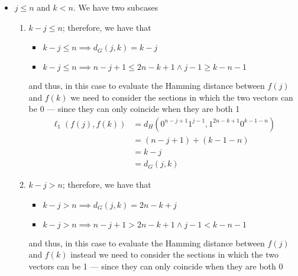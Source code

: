 \documentclass[a4paper, 12pt]{report}
\begin{document}
{\begin{itemize}
            \item $j \le n$ and $k < n$. We have two subcases
                \begin{enumerate}
                    \item $k - j \le n$; therefore, we have that
                        \begin{itemize}
                            \item $k - j \le n \implies d_G(j, k) = k - j$
                            \item $k - j \le n \implies n - j + 1 \le 2n - k + 1 \land j - 1 \ge k - n - 1$
                        \end{itemize}
                        and thus, in this case to evaluate the Hamming distance between $f(j)$ and $f(k)$ we need to consider the sections in which the two vectors can be 0 --- since they can only coincide when they are both 1
                        \begin{equation*}
                            \begin{split}
                                \ell_1(f(j), f(k)) &= d_H(0^{n - j + 1}1^{j - 1}, 1^{2n - k + 1}0^{k - 1- n}) \\
                                                   &= (n - j + 1) + (k - 1 - n) \\
                                                   &= k - j \\
                                                   &= d_G(j, k)
                            \end{split}
                        \end{equation*}
                    \item $k - j > n$; therefore, we have that
                        \begin{itemize}
                            \item $k - j > n \implies d_G(j, k) = 2n - k + j$
                            \item $k - j > n \implies n - j + 1 > 2n - k + 1 \land j - 1 < k - n - 1$
                        \end{itemize}
                        and thus, in this case to evaluate the Hamming distance between $f(j)$ and $f(k)$ instead we need to consider the sections in which the two vectors can be 1 --- since they can only coincide when they are both 0
                        \begin{equation*}
                            \begin{split}

\end{split}
\end{equation*}
\end{enumerate}
\end{itemize}}
\end{document}
